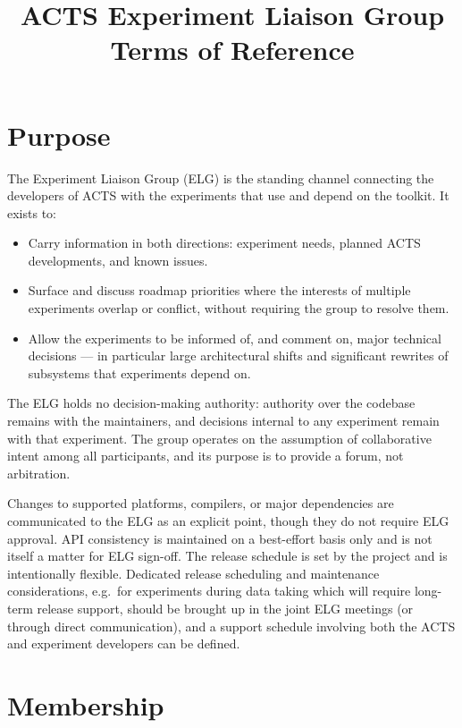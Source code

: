 \documentclass[11pt,a4paper]{article}
\title{ACTS Experiment Liaison Group\\ \large Terms of Reference}
\date{\docstamp}
\author{}
\begin{document}
\maketitle
\vspace{-3em}

\section*{Purpose}

The Experiment Liaison Group (ELG) is the standing channel connecting the developers of ACTS with the experiments that use and depend on the toolkit. It exists to:

\begin{itemize}
    \item Carry information in both directions: experiment needs, planned ACTS developments, and known issues.
    \item Surface and discuss roadmap priorities where the interests of multiple experiments overlap or conflict, without requiring the group to resolve them.
    \item Allow the experiments to be informed of, and comment on, major technical decisions --- in particular large architectural shifts and significant rewrites of subsystems that experiments depend on.
\end{itemize}

The ELG holds no decision-making authority: authority over the codebase remains with the maintainers, and decisions internal to any experiment remain with that experiment. The group operates on the assumption of collaborative intent among all participants, and its purpose is to provide a forum, not arbitration.

Changes to supported platforms, compilers, or major dependencies are communicated to the ELG as an explicit point, though they do not require ELG approval. API consistency is maintained on a best-effort basis only and is not itself a matter for ELG sign-off. The release schedule is set by the project and is intentionally flexible. Dedicated release scheduling and maintenance considerations, e.g.~for experiments during data taking which will require long-term release support, should be brought up in the joint ELG meetings (or through direct communication), and a support schedule involving both the ACTS and experiment developers can be defined.

\section*{Membership}
\end{document}
